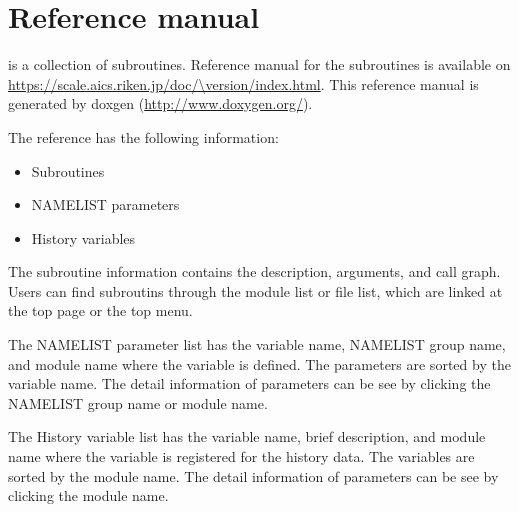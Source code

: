 \section{Reference manual} \label{sec:reference_manual}
\scalelib is a collection of subroutines.
Reference manual for the subroutines is available on
\url{https://scale.aics.riken.jp/doc/\version/index.html}.
This reference manual is generated by doxgen (\url{http://www.doxygen.org/}).

The reference has the following information:
\begin{itemize}
\item Subroutines
\item NAMELIST parameters
\item History variables
\end{itemize}



The subroutine information contains the description, arguments, and call graph.
Users can find subroutins through the module list or file list, which are linked at the top page or the top menu.

The NAMELIST parameter list has the variable name, NAMELIST group name, and module name where the variable is defined.
The parameters are sorted by the variable name.
The detail information of parameters can be see by clicking the NAMELIST group name or module name.

The History variable list has the variable name, brief description, and module name where the variable is registered for the history data.
The variables are sorted by the module name.
The detail information of parameters can be see by clicking the module name.
